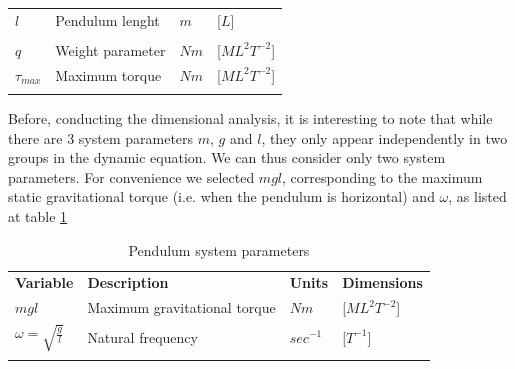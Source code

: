 \begin{table}[htb]
\begin{tabular}{p{0.8cm} p{2.5cm} p{0.8cm} p{1.5cm} }
   $l$ & Pendulum lenght & $m$ & [$L$]  \\ \noalign{\smallskip} \hline \noalign{\smallskip}
   \hline \hline \noalign{\smallskip} 
   \multicolumn{4}{c}{\textbf{Problem parameters}}\\ \noalign{\smallskip}  \hline\hline  \noalign{\smallskip} 
   $q$ & Weight parameter  & $Nm$ & [$ML^2T^{-2}$]   \\ \noalign{\smallskip} \hline \noalign{\smallskip}
   $\tau_{max}$ & Maximum torque & $Nm$ & [$ML^2T^{-2}$] \\ \noalign{\smallskip} \hline \noalign{\smallskip}
   \hline \noalign{\smallskip}
   \end{tabular}
\end{table}

Before, conducting the dimensional analysis, it is interesting to note that while there are 3 system parameters $m$, $g$ and $l$, they only appear independently in two groups in the dynamic equation. We can thus consider only two system parameters. For convenience we selected $mgl$, corresponding to the maximum static gravitational torque (i.e. when the pendulum is horizontal) and $\omega$, as listed at table \ref{tb:2param}
\begin{table}[htb]
   \centering %
   \caption{Pendulum system parameters} 
   \label{tb:2param}
   \begin{tabular}{p{1.5cm} p{2.2cm} p{0.8cm} p{1.5cm} }
   \hline \hline \noalign{\smallskip} \noalign{\smallskip} 
   \textbf{Variable} & \textbf{Description} & \textbf{Units} & \textbf{Dimensions} \\ \noalign{\smallskip}  \hline\hline  \noalign{\smallskip} 
   $mgl$ & Maximum gravitational torque  & $Nm$ & [$ML^2T^{-2}$]  \\ \noalign{\smallskip} \hline \noalign{\smallskip}
   $\omega = \sqrt{\frac{g}{l}}$ & Natural frequency & $sec^{-1}$ & [$T^{-1}$]  \\ \noalign{\smallskip} \hline \noalign{\smallskip}
   \hline \noalign{\smallskip}
   \end{tabular}
\end{table}






